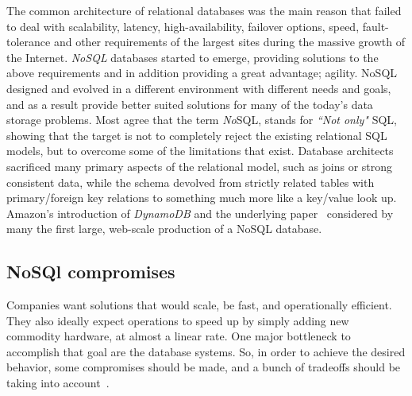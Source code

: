 The common architecture of relational databases was the main reason that failed
to deal with scalability, latency, high-availability, failover options, speed,
fault-tolerance and other requirements of the largest sites during the massive
growth of the Internet. \emph{NoSQL} databases started to emerge, providing
solutions to the above requirements and in addition providing a great advantage;
agility. NoSQL designed and evolved in a different environment with different
needs and goals, and as a result provide better suited solutions for many of the
today's data storage
problems. Most agree that the term \emph{No}SQL, stands for \emph{``Not only"}
SQL, showing that the target is not to completely reject the existing relational
SQL models, but to overcome some of the limitations that exist. Database
architects sacrificed many primary aspects of the relational model, such as
joins or strong consistent data, while the schema devolved from strictly related
tables with primary/foreign key relations to something much more like a
key/value look up. Amazon's introduction of \emph{DynamoDB} and the underlying
paper~\cite{dynamo} considered by many the first large, web-scale production of
a NoSQL database.

\subsection{NoSQl compromises}

Companies want solutions that would scale, be fast, and operationally efficient.
They also ideally expect operations to speed up by simply adding new commodity
hardware, at almost a linear rate. One major bottleneck to accomplish that goal
are the database systems. So, in order to achieve the desired behavior, some
compromises should be made, and a bunch of tradeoffs should be taking into
account~\cite{burd}.

